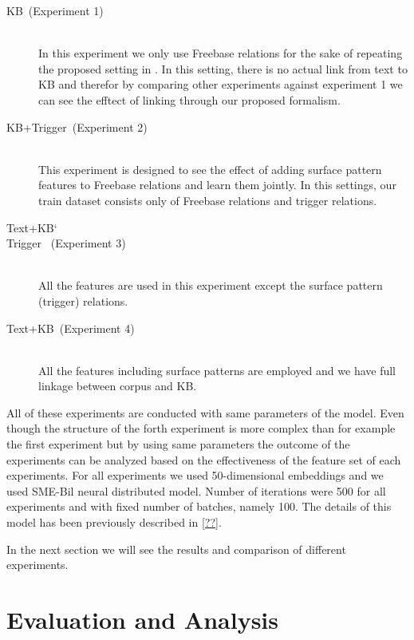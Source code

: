 \begin {description}
\item[KB~(Experiment 1)] \hfil \\
In this experiment we only use Freebase relations for the sake of repeating the
proposed setting in \cite{Bordes2011}. In this setting, there is no actual link
from text to KB and therefor by comparing other experiments against experiment 1
we can see the efftect of linking through our proposed formalism.
\item[KB+Trigger~(Experiment 2)] \hfill \\
This experiment is designed to see the effect of adding surface pattern features
to Freebase relations and learn them jointly. In this settings, our train
dataset consists only of Freebase relations and trigger relations.
\item[Text+KB\char`\\Trigger ~(Experiment 3)] \hfill \\
All the features are used in this experiment except
the surface pattern (trigger) relations. 
\item[Text+KB~(Experiment 4)] \hfill \\
All the features including surface patterns are employed and we have full
linkage between corpus and KB. 
\end{description}

All of these experiments are conducted with same parameters of the model. Even
though the structure of the forth experiment is more complex than for example
the first experiment but by using same parameters the outcome of the experiments
can be analyzed based on the effectiveness of the feature set of each
experiments. For all experiments we used 50-dimensional embeddings and we used
SME-Bil neural distributed model. Number of iterations were 500 for all
experiments and with fixed number of batches, namely 100. The details of this
model has been previously described in \autoref{??}.

In the next section we will see the results and comparison of different
experiments.


\section{Evaluation and Analysis}
\label{sec:textkb-exp-exp}


